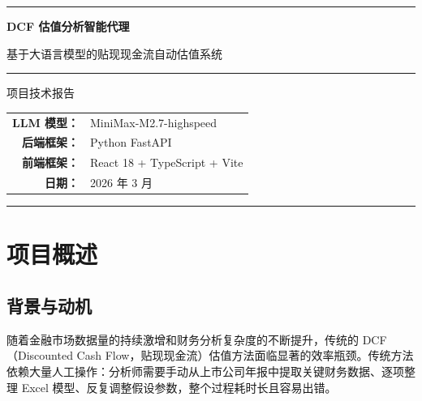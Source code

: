 \documentclass[12pt,a4paper]{article}
\begin{document}
\begin{titlepage}
\begin{center}
\vspace*{3cm}

{\color{primary}\rule{\textwidth}{2pt}}

\vspace{1.5cm}

{\fontsize{28}{34}\selectfont\sffamily\bfseries\color{primary}
DCF 估值分析智能代理}

\vspace{0.8cm}

{\fontsize{16}{20}\selectfont\sffamily\color{accent}
基于大语言模型的贴现现金流自动估值系统}

\vspace{0.5cm}

{\color{primary}\rule{0.6\textwidth}{1pt}}

\vspace{2cm}

{\large\sffamily 项目技术报告}

\vspace{3cm}

\begin{tabular}{rl}
\textbf{LLM 模型：} & MiniMax-M2.7-highspeed \\[6pt]
\textbf{后端框架：} & Python FastAPI \\[6pt]
\textbf{前端框架：} & React 18 + TypeScript + Vite \\[6pt]
\textbf{日期：} & 2026 年 3 月 \\
\end{tabular}

\vfill

{\color{primary}\rule{\textwidth}{2pt}}
\end{center}
\end{titlepage}

\tableofcontents
\newpage

\section{项目概述}

\subsection{背景与动机}

随着金融市场数据量的持续激增和财务分析复杂度的不断提升，传统的 DCF（Discounted Cash Flow，贴现现金流）估值方法面临显著的效率瓶颈。传统方法依赖大量人工操作：分析师需要手动从上市公司年报中提取关键财务数据、逐项整理 Excel 模型、反复调整假设参数，整个过程耗时长且容易出错。
\end{document}
